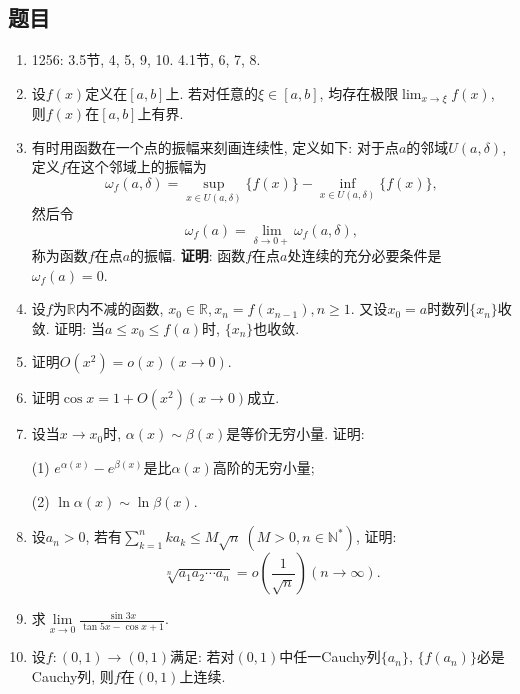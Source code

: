 \documentclass[UTF8,11pt, a4paper, oneside, fontset=none]{ctexbook}
\begin{document}
\subsection*{题目}
\begin{enumerate}

\item {\color{red} 1256}: 3.5节, 4, 5, 9, 10. 4.1节, 6, 7, 8.

\item 设$f(x)$定义在$[a, b]$上. 若对任意的$\xi \in [a, b]$, 均存在极限$\lim_{x \to \xi}f(x)$, 则$f(x)$在$[a, b]$上有界.

\item 有时用函数在一个点的振幅来刻画连续性, 定义如下: 对于点$a$的邻域$U(a, \delta)$, 定义$f$在这个邻域上的振幅为
\[
\omega_f(a, \delta) = \sup_{x \in U(a, \delta)}\{ f(x)\} - \inf_{x \in U(a, \delta)}\{ f(x)\},
\]
然后令
\[
\omega_f(a) = \lim_{\delta \to 0+} \omega_f(a, \delta),
\]
称为函数$f$在点$a$的振幅. {\bf 证明}: 函数$f$在点$a$处连续的充分必要条件是$\omega_f(a) =0$.
 

\item 设$f$为$\mathbb R$内不减的函数, $x_0 \in \mathbb R, x_n = f(x_{n-1}), n \geq 1$. 又设$x_0 =a$时数列$\{x_n\}$收敛. 证明: 当$a \leq x_0 \leq f(a)$时, $\{x_n\}$也收敛.

\item 证明$O(x^2) = o(x) (x \to 0)$.

\item 证明$\cos x = 1 + O(x^2) (x \to 0)$成立.

\item 设当$x \to x_0$时, $\alpha(x) \sim \beta(x)$是等价无穷小量. 证明:

(1) $e^{\alpha(x)} - e^{\beta(x)}$是比$\alpha(x)$高阶的无穷小量;

(2) $\ln \alpha(x) \sim \ln \beta(x) $.

\item 设$a_n >0$, 若有$\sum_{k=1}^n k a_k \leq M \sqrt{n} \ (M >0, n \in \mathbb N^*)$, 证明:
\[
\sqrt[n]{a_1 a_2 \cdots a_n} = o\left(\frac{1}{\sqrt{n}}\right) (n \to \infty).
\]

\item 求$\lim\limits_{x \to 0} \frac{\sin 3x}{\tan 5x - \cos x +1}$.

\item 设$f : (0, 1) \to (0, 1)$满足: 若对$(0, 1)$中任一Cauchy列$\{a_n\}$, $\{f(a_n) \}$必是Cauchy列, 则$f$在$(0, 1)$上连续.

\end{enumerate}
\clearpage
\end{document}

